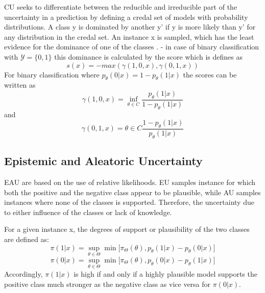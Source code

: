 \ac{CU} seeks to differentiate between the reducible and irreducible part of the uncertainty in a prediction by defining a credal set of models with probability distributions.
A class y is dominated by another y' if y is more likely than y' for any distribution in the credal set.
An instance x is sampled, which has the least evidence for the dominance of one of the classes \cite{nguyen2021howtomeasure}.
- in case of binary classification with $\mathcal{Y} = \{0, 1\}$ this dominance is calculated by the score which is defines as
\begin{equation}
    s(x) = -max (\gamma(1,0,x), \gamma(0,1,x))
\end{equation} 
For binary classification where $p_{\theta}(0|x) = 1 - p_{\theta}(1|x)$ the scores can be written as 
\begin{equation}
\gamma(1,0,x) = \inf_{\theta \in C} \frac{p_{\theta}(1 | x)}{1 - p_{\theta}(1 | x)}
\end{equation} 
and
\begin{equation}
\gamma(0,1,x) = {\theta \in C} \frac{1 - p_{\theta}(1 | x)}{p_{\theta}(1 | x)}
\end{equation} 



\subsection{Epistemic and Aleatoric Uncertainty}
\ac{EAU} are based on the use of relative likelihoods. 
\ac{EU} samples instance for which both the positive and the negative class appear to be plausible, while \ac{AU} samples instances where none of the classes is supported.
Therefore, the uncertainty due to either influence of the classes or lack of knowledge. 

For a given instance x, the degrees of support or plausibility of the two classes are defined as:
\begin{equation}
\pi(1 | x) = \sup_{\theta \in \Theta} \min \bigg[ \pi_{\Theta}(\theta), p_{\theta}(1 | x) - p_{\theta}(0 | x)\bigg]
\end{equation} 
\begin{equation}
\pi(0 | x) = \sup_{\theta \in \Theta} \min \bigg[ \pi_{\Theta}(\theta), p_{\theta}(0 | x) - p_{\theta}(1 | x)\bigg]
\end{equation} 
Accordingly, $\pi(1 | x)$ is high if and only if a highly plausible model supports the positive class much stronger as the negative class as vice versa for $\pi(0 | x)$.

